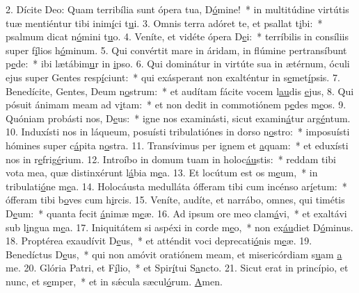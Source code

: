 2. Dícite Deo: Quam terribília sunt ópera tua, D\uline{ó}mine!~* in multitúdine virtútis tuæ mentiéntur tibi inim\uline{í}ci t\uline{u}i.
3. Omnis terra adóret te, et psallat t\uline{i}bi:~* psalmum dicat n\uline{ó}mini t\uline{u}o.
4. Veníte, et vidéte ópera D\uline{e}i:~* terríbilis in consíliis super f\uline{í}lios h\uline{ó}minum.
5. Qui convértit mare in áridam, in flúmine pertransíbunt p\uline{e}de:~* ibi lætábim\uline{u}r in \uline{i}pso.
6. Qui dominátur in virtúte sua in ætérnum, óculi ejus super Gentes resp\uline{í}ciunt:~* qui exásperant non exalténtur in s\uline{e}met\uline{í}psis.
7. Benedícite, Gentes, Deum n\uline{o}strum:~* et audítam fácite vocem l\uline{au}dis \uline{e}jus,
8. Qui pósuit ánimam meam ad v\uline{i}tam:~* et non dedit in commotiónem p\uline{e}des m\uline{e}os.
9. Quóniam probásti nos, D\uline{e}us:~* igne nos examinásti, sicut examin\uline{á}tur arg\uline{é}ntum.
10. Induxísti nos in láqueum, posuísti tribulatiónes in dorso n\uline{o}stro:~* imposuísti hómines super c\uline{á}pita n\uline{o}stra.
11. Transívimus per ignem et \uline{a}quam:~* et eduxísti nos in r\uline{e}frig\uline{é}rium.
12. Introíbo in domum tuam in holoc\uline{áu}stis:~* reddam tibi vota mea, quæ distinxérunt l\uline{á}bia m\uline{e}a.
13. Et locútum est os m\uline{e}um,~* in tribulati\uline{ó}ne m\uline{e}a.
14. Holocáusta medulláta ófferam tibi cum incénso ar\uline{í}etum:~* ófferam tibi b\uline{o}ves cum h\uline{i}rcis.
15. Veníte, audíte, et narrábo, omnes, qui timétis D\uline{e}um:~* quanta fecit \uline{á}nimæ m\uline{e}æ.
16. Ad ipsum ore meo clam\uline{á}vi,~* et exaltávi sub l\uline{i}ngua m\uline{e}a.
17. Iniquitátem si aspéxi in corde m\uline{e}o,~* non ex\uline{áu}diet D\uline{ó}minus.
18. Proptérea exaudívit D\uline{e}us,~* et atténdit voci deprecati\uline{ó}nis m\uline{e}æ.
19. Benedíctus D\uline{e}us,~* qui non amóvit oratiónem meam, et misericórdiam s\uline{u}am \uline{a} me.
20. Glória Patri, et F\uline{í}lio,~* et Spir\uline{í}tui S\uline{a}ncto.
21. Sicut erat in princípio, et nunc, et s\uline{e}mper,~* et in sǽcula sæcul\uline{ó}rum. \uline{A}men.
